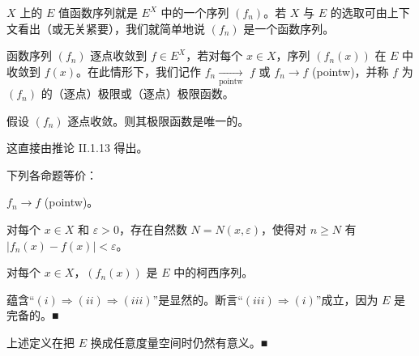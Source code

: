 $X$ 上的 $E$ 值函数序列就是 $E^X$ 中的一个序列 $(f_n)$。若 $X$ 与 $E$ 的选取可由上下文看出（或无关紧要），我们就简单地说 $(f_n)$ 是一个函数序列。

函数序列 $(f_n)$ 逐点收敛到 $f \in E^X$，若对每个 $x \in X$，序列 $(f_n(x))$ 在 $E$ 中收敛到 $f(x)$。在此情形下，我们记作 $f_n \xrightarrow[\text{pointw}]{}$ $f$ 或 $f_n \to f$ (pointw)，并称 $f$ 为 $(f_n)$ 的（逐点）极限或（逐点）极限函数。

\begin{remark}

\begin{items}
\item

假设 $ (f_{n}) $ 逐点收敛。则其极限函数是唯一的。

\proofhead
这直接由推论 II.1.13 得出。
\item

下列各命题等价：

\begin{subitems}
\item

$ f_{n} \rightarrow f $ (pointw)。

\item

对每个 $ x \in X $ 和 $ \varepsilon > 0 $，存在自然数 $ N = N(x, \varepsilon) $，使得对 $ n \geq N $ 有 $ |f_n(x) - f(x)| < \varepsilon $。

\item

对每个 $ x \in X $，$ (f_n(x)) $ 是 $ E $ 中的柯西序列。

\proofhead
蕴含“$(i) \Rightarrow (ii) \Rightarrow (iii)$”是显然的。断言“$(iii) \Rightarrow (i)$”成立，因为 $ E $ 是完备的。■
\end{subitems}

\item

上述定义在把 $ E $ 换成任意度量空间时仍然有意义。■

\end{items}

\end{remark}

